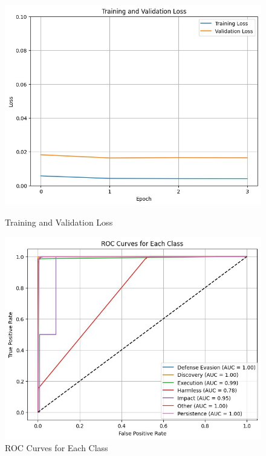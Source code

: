             \begin{figure}[h]
                \centering
                \begin{minipage}[c]{0.47\textwidth}
                    \centering
                    \includegraphics[width=\textwidth]{../figures/plots/section4/loss_curves.png}
                    \caption{Training and Validation Loss}
                    \label{fig:loss}
                \end{minipage}
                \hfill
                \begin{minipage}[c]{0.47\textwidth}
                    \centering
                    \includegraphics[width=\textwidth]{../figures/plots/section4/roc_curves.png}
                    \caption{ROC Curves for Each Class}
                    \label{fig:roc}
                \end{minipage}
            \end{figure}

